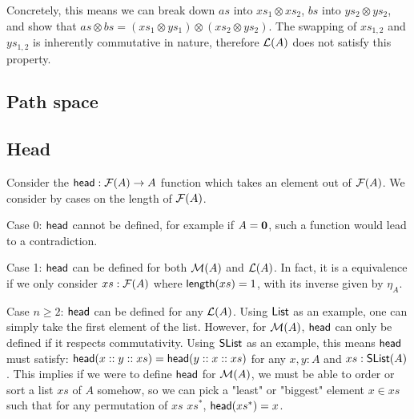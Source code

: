 Concretely, this means we can break down $as$ into $xs_1 \otimes xs_2$,
$bs$ into $ys_2 \otimes ys_2$, and show that $as \otimes bs = (xs_1 \otimes ys_1) \otimes (xs_2 \otimes ys_2)$.
The swapping of $xs_{1,2}$ and $ys_{1,2}$ is inherently commutative in nature,
therefore $\mathcal{L}(A)$ does not satisfy this property.

\subsection{Path space}

\subsection{Head}
Consider the $\operatorname{\mathsf{head}} : \mathcal{F}(A) \to A$ function which takes an element out of $\mathcal{F}(A)$.
We consider by cases on the length of $\mathcal{F}(A)$.

Case 0: $\operatorname{\mathsf{head}}$ cannot be defined, for example if $A = {\mathbf{0}}$, such a function would lead to
a contradiction.

Case 1: $\operatorname{\mathsf{head}}$ can be defined for both $\mathcal{M}(A)$ and $\mathcal{L}(A)$. In fact, it is a equivalence
if we only consider $xs : \mathcal{F}(A)$ where $\operatorname{\mathsf{length}}(xs) = 1$, with its inverse given by $\eta_A$.

Case $n \geq 2$: $\operatorname{\mathsf{head}}$ can be defined for any $\mathcal{L}(A)$. Using $\operatorname{\mathsf{List}}$ as an example, one can simply
take the first element of the list. However, for $\mathcal{M}(A)$, $\operatorname{\mathsf{head}}$ can only be defined if it
respects commutativity. Using $\operatorname{\mathsf{SList}}$ as an example, this means $\operatorname{\mathsf{head}}$ must satisfy:
$\operatorname{\mathsf{head}}(x :: y :: xs) = \operatorname{\mathsf{head}}(y :: x :: xs)$ for any $x, y : A$ and $xs : \operatorname{\mathsf{SList}}(A)$.
This implies if we were to define $\operatorname{\mathsf{head}}$ for $\mathcal{M}(A)$, we must be able to order or sort a
list $xs$ of $A$ somehow, so we can pick a "least" or "biggest" element $x \in xs$ such that for any
permutation of $xs$ $xs^*$, $\operatorname{\mathsf{head}}(xs^*) = x$.
